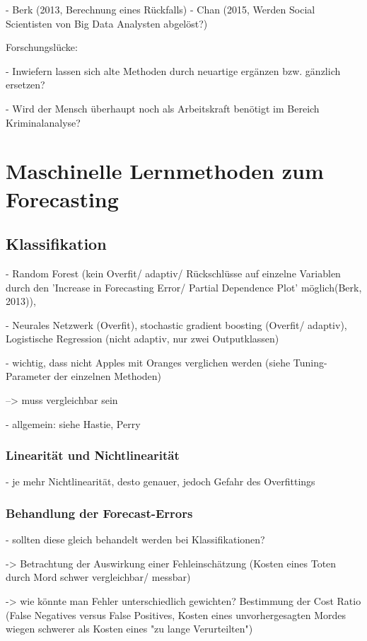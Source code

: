 \documentclass[a4paper,12pt,parskip,bibtotoc,liststotoc]{article}
\begin{document}
- Berk (2013, Berechnung eines Rückfalls)
- Chan (2015, Werden Social Scientisten von Big Data Analysten abgelöst?) 


Forschungslücke: 

- Inwiefern lassen sich alte Methoden durch neuartige ergänzen bzw. gänzlich ersetzen?

- Wird der Mensch überhaupt noch als Arbeitskraft benötigt im Bereich Kriminalanalyse?

\newpage
\section{Maschinelle Lernmethoden zum Forecasting}

\subsection{Klassifikation}

- Random Forest (kein Overfit/ adaptiv/ Rückschlüsse auf einzelne Variablen durch den 'Increase in Forecasting Error/ Partial Dependence Plot' möglich(Berk, 2013)), 

- Neurales Netzwerk (Overfit), stochastic gradient boosting (Overfit/ adaptiv), Logistische Regression (nicht adaptiv, nur zwei Outputklassen) 

- wichtig, dass nicht Apples mit Oranges verglichen werden (siehe Tuning-Parameter der einzelnen Methoden)

--> muss vergleichbar sein

- allgemein: siehe Hastie, Perry


\subsubsection{Linearität und Nichtlinearität}

- je mehr Nichtlinearität, desto genauer, jedoch Gefahr des Overfittings

\subsubsection{Behandlung der Forecast-Errors}

- sollten diese gleich behandelt werden bei Klassifikationen?

-> Betrachtung der Auswirkung einer Fehleinschätzung (Kosten eines Toten durch Mord schwer vergleichbar/ messbar)

-> wie könnte man Fehler unterschiedlich gewichten? Bestimmung der Cost Ratio (False Negatives versus False Positives, Kosten eines unvorhergesagten Mordes wiegen schwerer als Kosten eines "zu lange Verurteilten")
\end{document}
